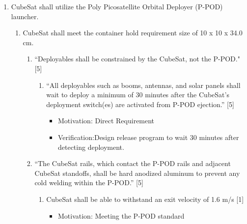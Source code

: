 \begin{enumerate}
\begin{enumerate}
\begin{enumerate}
\begin{enumerate}
\begin{itemize}
                        \item Motivation: Delicate components such as PCBs and antenna have natural frequencies which must be avoided to avoid resonance. Resonance could result in the failure of components.
                        \item Verification: Use ANSYS’s modal analysis features on specific parts and on the assembled CAD model.
                    \end{itemize}
        \end{enumerate}
        \end{enumerate}
    \end{enumerate}  %
    \item CubeSat shall utilize the Poly Picosatellite Orbital Deployer (P-POD) launcher.
    \begin{enumerate}
        \item CubeSat shall meet the container hold requirement size of 10 x 10 x 34.0 cm. 
        \begin{enumerate}
            \item  “Deployables shall be constrained by the CubeSat, not the P-POD." [5] \cite{}
                \begin{enumerate}
                    \item “All deployables such as booms, antennas, and solar panels shall wait to deploy a minimum of 30 minutes after the CubeSat's deployment switch(es) are activated from P-POD ejection.” [5] \cite{}
                        \begin{itemize}
                            \item Motivation: Direct Requirement
                            \item Verification:Design release program to wait 30 minutes after detecting deployment. 
                        \end{itemize}
                \end{enumerate}
            \item  “The CubeSat rails, which contact the P-POD rails and adjacent CubeSat standoffs, shall be hard anodized aluminum to prevent any cold welding within the P-POD.” [5]
                \begin{enumerate}
                    \item CubeSat shall be able to withstand an exit velocity of 1.6 m/s [1] 
                           \begin{itemize}
                                \item Motivation: Meeting the P-POD standard

\end{itemize}
\end{enumerate}
\end{enumerate}
\end{enumerate}
\end{enumerate}

